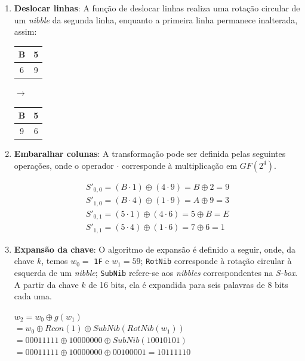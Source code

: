 \documentclass{article}
\begin{document}
\begin{enumerate}
    \item \textbf{Deslocar linhas}: A função de deslocar linhas realiza uma
    rotação circular de um \textit{nibble} da segunda linha, enquanto a
    primeira linha permanece inalterada, assim:
    \begin{center}
        \begin{tabular}{|c|c|}
            \hline
            B & 5  \\
            \hline
            6 & 9 \\
            \hline
        \end{tabular}
        $\to$
        \begin{tabular}{|c|c|}
            \hline
            B & 5  \\
            \hline
            9 & 6 \\
            \hline
        \end{tabular}
    \end{center}
    
    \item \textbf{Embaralhar colunas}: A transformação pode ser definida pelas
    seguintes operações, onde o operador $\cdot$ corresponde à multiplicação em
    $GF(2^{4})$.
    \begin{center}
        \begin{gather*}
            S'_{0, 0} = (B \cdot 1) \oplus (4 \cdot 9) = B \oplus 2 = 9 \\
            S'_{1, 0} = (B \cdot 4) \oplus (1 \cdot 9) = A \oplus 9 = 3 \\
            S'_{0, 1} = (5 \cdot 1) \oplus (4 \cdot 6) = 5 \oplus B = E \\
            S'_{1, 1} = (5 \cdot 4) \oplus (1 \cdot 6) = 7 \oplus 6 = 1
        \end{gather*}
    \end{center}
    
    \item \textbf{Expansão da chave}: O algoritmo de expansão é definido a
    seguir, onde, da chave $k$, temos $w_{0} =$ \texttt{1F} e $w_{1} = 59$;
    \texttt{RotNib} corresponde à rotação circular à esquerda de um
    \textit{nibble}; \texttt{SubNib} refere-se aos \textit{nibbles}
    correspondentes na \textit{S-box}. A partir da chave $k$ de 16 bits, ela é
    expandida para seis palavras de 8 bits cada uma.

    $w_{2} = w_{0} \oplus g(w_{1})$ \\
    $= w_{0} \oplus Rcon(1) \oplus SubNib(RotNib(w_{1}))$ \\
    $= 00011111 \oplus 10000000 \oplus SubNib(10010101)$ \\
    $= 00011111 \oplus 10000000 \oplus 00100001 = 10111110$
    

\end{enumerate}
\end{document}
